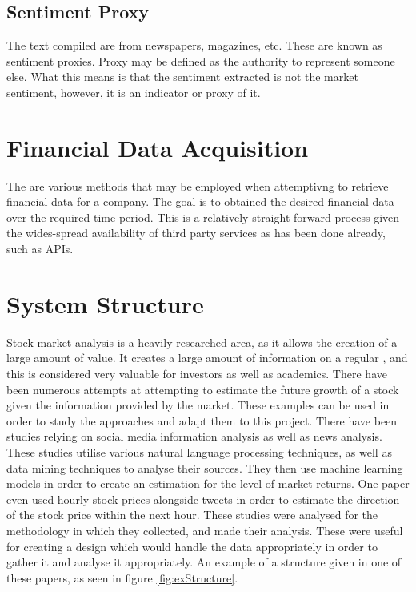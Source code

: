 \subsection{Sentiment Proxy}

The text compiled are from newspapers, magazines, etc. These are known as sentiment proxies. Proxy may be defined as the authority to represent someone else. What this means is that the sentiment extracted is not the market sentiment, however, it is an indicator or proxy of it.

\section{Financial Data Acquisition}

The are various methods that may be employed when attemptivng to retrieve financial data for a company. The goal is to obtained the desired financial data over the required time period. This is a relatively straight-forward process given the wides-spread availability of third party services as has been done already, such as APIs\cite{hochreiter2015computing}.

\section{System Structure}

Stock market analysis is a heavily researched area, as it allows the creation of a large amount of value. It creates a large amount of information on a regular , and this is considered very valuable for investors as well as academics. There have been numerous attempts at attempting to estimate the future growth of a stock given the information provided by the market\cite{khedr2017predicting,pagolu2016sentiment,nti2020predicting}. These examples can be used in order to study the approaches and adapt them to this project. There have been studies relying on social media information analysis\cite{3f9f26dccdd44d8e9791959e44112b4b} as well as news analysis\cite{Uhr2014SentimentAI}. These studies utilise various natural language processing techniques, as well as data mining techniques to analyse their sources. They then use machine learning models in order to create an estimation for the level of market returns. One paper\cite{7e2040917a3f4f90a22d23d66e18f6f8} even used hourly stock prices alongside tweets in order to estimate the direction of the stock price within the next hour. These studies were analysed for the methodology in which they collected, and made their analysis. These were useful for creating a design which would handle the data appropriately in order to gather it and analyse it appropriately. An example of a structure given in one of these papers\cite{khedr2017predicting}, as seen in figure \ref{fig:exStructure}.

